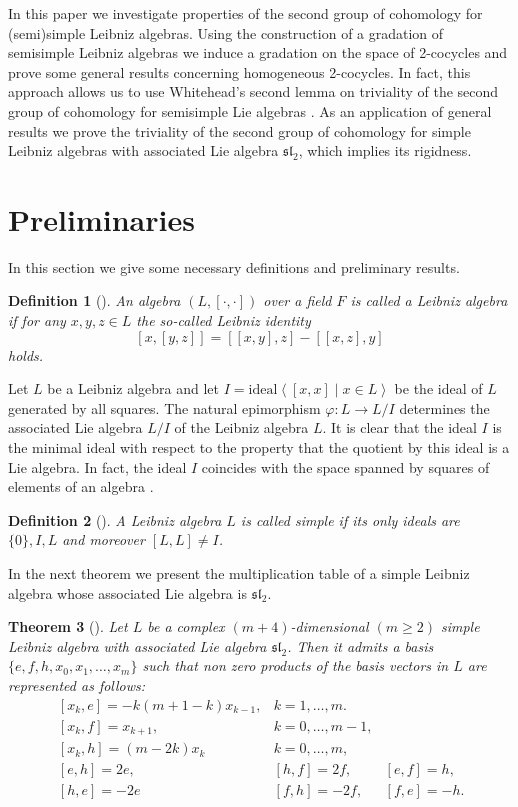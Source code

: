 \documentclass[12pt,reqno]{amsart}
\newtheorem{thm}{Theorem}[section]
\newtheorem{defn}[thm]{Definition}
\numberwithin{equation}{section}
\begin{document}
In this paper we investigate properties of the second group of cohomology for (semi)simple Leibniz algebras.
 Using the construction of a gradation of semisimple Leibniz algebras we induce a gradation on the space of 2-cocycles
 and prove some general results concerning homogeneous 2-cocycles. In fact, this approach allows us to use Whitehead's second lemma
  on triviality of the second group of cohomology for semisimple Lie algebras \cite{Jac}. As an application of general results
  we prove the triviality of the second group of cohomology for simple Leibniz algebras with associated Lie algebra $ \mathfrak{sl}_2$, which implies its rigidness.

\section{Preliminaries}

In this section we give some necessary definitions and preliminary results.

\begin{defn} [\cite{Lod2}] An algebra $(L,[\cdot,\cdot])$ over a field $F$ is called a
Leibniz algebra if for any $x,y,z\in L$ the so-called Leibniz identity
\[[x,[y,z]]=[[x,y],z] - [[x,z],y]\] holds.
\end{defn}

Let $L$ be a Leibniz algebra and let $I=\text{ideal} \left< [x,x]   \mid  x\in L
\right>$ be the ideal of $L$ generated by all squares. The natural
epimorphism $\varphi  \colon L \rightarrow   L/I$ determines the
associated Lie algebra $L/I$ of the Leibniz algebra $L$. It is
clear that the ideal $I$ is the minimal ideal with respect to the
property that the quotient by this ideal is a Lie algebra. In fact, the ideal $I$ coincides with the space spanned by squares of elements of an algebra \cite{Bar4}.

\begin{defn} [\cite{AbDz}]
A Leibniz algebra $L$ is called simple if its only ideals are $\{0\}, I, L$ and moreover $[L,L]\neq I$.
\end{defn}

In the next theorem we present the  multiplication table of a simple Leibniz algebra whose associated Lie algebra is $ \mathfrak{sl}_2$.

\begin{thm}[\cite{ORT}] \label{simple} Let $L$ be a complex $(m+4)$-dimensional $(m\geq 2)$ simple Leibniz algebra with associated Lie algebra
 $ \mathfrak{sl}_2$. Then it admits a basis $\{e,f,h,x_0,x_1,\dots,x_m\}$ such that non zero products of the basis vectors in $L$ are represented as follows:
\[\begin{array}{lll}
\, [x_k,e]=-k(m+1-k)x_{k-1}, & k=1, \dots, m. &\\
\, [x_k,f]=x_{k+1},  & k=0, \dots, m-1, & \\
\, [x_k,h]=(m-2k)x_k & k=0, \dots, m,&\\
\, [e,h]=2e, & [h,f]=2f, &[e,f]=h, \\
\, [h,e]=-2e& [f,h]=-2f, & [f,e]=-h.\\
 \end{array}\]
\end{thm}
\end{document}
